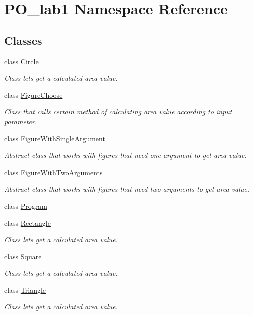 \hypertarget{namespace_p_o__lab1}{}\section{P\+O\+\_\+lab1 Namespace Reference}
\label{namespace_p_o__lab1}
\subsection*{Classes}
\begin{DoxyCompactItemize}
\item 
class \mbox{\hyperlink{class_p_o__lab1_1_1_circle}{Circle}}
\begin{DoxyCompactList}\small\item\em Class lets get a calculated area value. \end{DoxyCompactList}\item 
class \mbox{\hyperlink{class_p_o__lab1_1_1_figure_choose}{Figure\+Choose}}
\begin{DoxyCompactList}\small\item\em Class that calls certain method of calculating area value according to input parameter. \end{DoxyCompactList}\item 
class \mbox{\hyperlink{class_p_o__lab1_1_1_figure_with_single_argument}{Figure\+With\+Single\+Argument}}
\begin{DoxyCompactList}\small\item\em Abstract class that works with figures that need one argument to get area value. \end{DoxyCompactList}\item 
class \mbox{\hyperlink{class_p_o__lab1_1_1_figure_with_two_arguments}{Figure\+With\+Two\+Arguments}}
\begin{DoxyCompactList}\small\item\em Abstract class that works with figures that need two arguments to get area value. \end{DoxyCompactList}\item 
class \mbox{\hyperlink{class_p_o__lab1_1_1_program}{Program}}
\item 
class \mbox{\hyperlink{class_p_o__lab1_1_1_rectangle}{Rectangle}}
\begin{DoxyCompactList}\small\item\em Class lets get a calculated area value. \end{DoxyCompactList}\item 
class \mbox{\hyperlink{class_p_o__lab1_1_1_square}{Square}}
\begin{DoxyCompactList}\small\item\em Class lets get a calculated area value. \end{DoxyCompactList}\item 
class \mbox{\hyperlink{class_p_o__lab1_1_1_triangle}{Triangle}}
\begin{DoxyCompactList}\small\item\em Class lets get a calculated area value. \end{DoxyCompactList}\end{DoxyCompactItemize}

